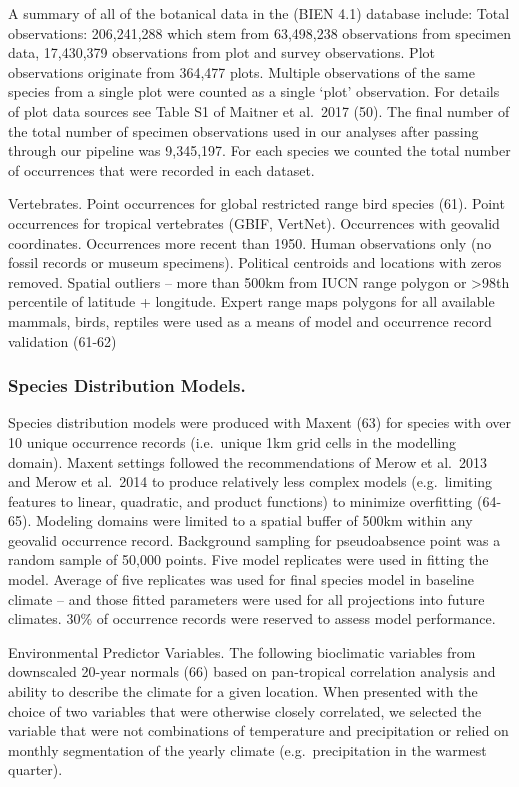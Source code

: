 \documentclass[]{article}
\begin{document}
A summary of all of the botanical data in the (BIEN 4.1) database include: Total observations: 206,241,288 which stem from 63,498,238 observations from specimen data, 17,430,379 observations from plot and survey observations. Plot observations originate from 364,477 plots. Multiple observations of the same species from a single plot were counted as a single `plot' observation. For details of plot data sources see Table S1 of Maitner et al.~2017 (50). The final number of the total number of specimen observations used in our analyses after passing through our pipeline was 9,345,197. For each species we counted the total number of occurrences that were recorded in each dataset.

Vertebrates. Point occurrences for global restricted range bird species (61). Point occurrences for tropical vertebrates (GBIF, VertNet). Occurrences with geovalid coordinates. Occurrences more recent than 1950. Human observations only (no fossil records or museum specimens). Political centroids and locations with zeros removed. Spatial outliers -- more than 500km from IUCN range polygon or \textgreater{}98th percentile of latitude + longitude. Expert range maps polygons for all available mammals, birds, reptiles were used as a means of model and occurrence record validation (61-62)

\hypertarget{species-distribution-models.}{%
\subsubsection{Species Distribution Models.}\label{species-distribution-models.}}

Species distribution models were produced with Maxent (63) for species with over 10 unique occurrence records (i.e.~unique 1km grid cells in the modelling domain). Maxent settings followed the recommendations of Merow et al.~2013 and Merow et al.~2014 to produce relatively less complex models (e.g.~limiting features to linear, quadratic, and product functions) to minimize overfitting (64-65). Modeling domains were limited to a spatial buffer of 500km within any geovalid occurrence record. Background sampling for pseudoabsence point was a random sample of 50,000 points. Five model replicates were used in fitting the model. Average of five replicates was used for final species model in baseline climate -- and those fitted parameters were used for all projections into future climates. 30\% of occurrence records were reserved to assess model performance.

Environmental Predictor Variables. The following bioclimatic variables from downscaled 20-year normals (66) based on pan-tropical correlation analysis and ability to describe the climate for a given location. When presented with the choice of two variables that were otherwise closely correlated, we selected the variable that were not combinations of temperature and precipitation or relied on monthly segmentation of the yearly climate (e.g.~precipitation in the warmest quarter).
\end{document}
